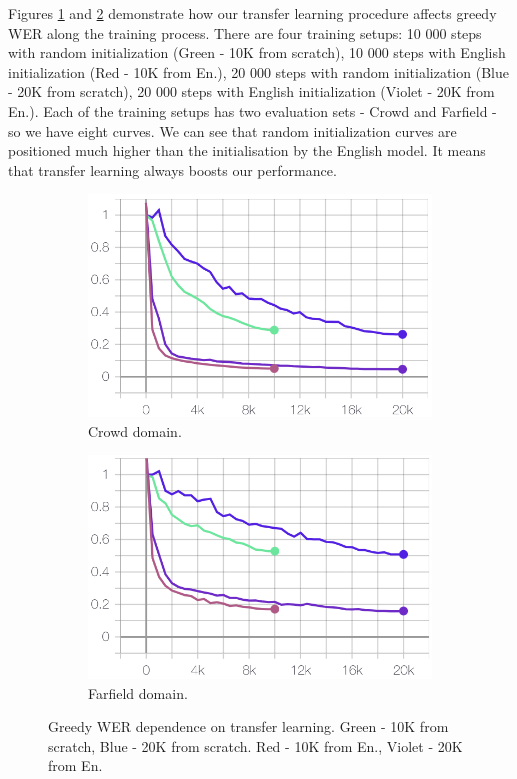 \documentclass[a4paper]{article}
\begin{document}
Figures \ref{fig:crowd_domain} and \ref{fig:portal_domain} demonstrate how our transfer learning procedure affects greedy WER along the training process. There are four training setups: 10 000 steps with random initialization (Green - 10K from scratch), 10 000 steps with English initialization (Red - 10K from En.), 20 000 steps with random initialization (Blue - 20K from scratch), 20 000 steps with English initialization (Violet - 20K from En.). Each of the training setups has two evaluation sets - Crowd and Farfield - so we have eight curves. We can see that random initialization curves are positioned much higher than the initialisation by the English model. It means that transfer learning always boosts our performance.

\begin{figure}[ht]
\begin{subfigure}{.49\linewidth}
  \centering
  \includegraphics[width=1.\linewidth]{LaTeX/img/crowd10k20k.png}  
  \caption{Crowd domain.}
  \label{fig:crowd_domain}
\end{subfigure}
\begin{subfigure}{.49\linewidth}
  \centering
  \includegraphics[width=1.\linewidth]{LaTeX/img/portal10k20k.png}  
  \caption{Farfield domain.}
  \label{fig:portal_domain}
\end{subfigure}
\caption{Greedy WER dependence on transfer learning. Green - 10K from scratch, Blue - 20K from scratch. Red - 10K from En., Violet - 20K from En.}
\label{fig:portal_crowd_domain}
\end{figure}
\end{document}

